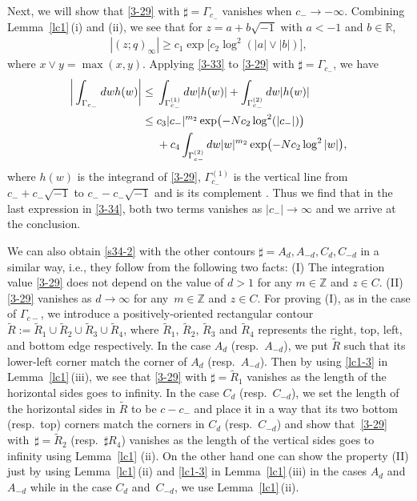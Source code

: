 \documentclass[11pt]{article}
\numberwithin{equation}{section}
\numberwithin{equation}{section}
\def\i{\infty}
\def\R{\mathbb{R}}
\begin{document}
 Next, we will show that \eqref{3-29} with $\sharp=\Gamma_{c_-}$ vanishes when $c_-\rightarrow -\i$. Combining Lem\-ma~\ref{lc1}\,(i) and (ii), we see that
 for $z=a+b\sqrt{-1}$ with $a<-1$ and $b\in\R$,
 \begin{align}
 \label{3-33}
 |(z;q)_{\i}|\ge c_1\exp\bigl[c_2\log^2(|a|\vee |b|)\bigr],
 \end{align}
 where $x\vee y=\max(x,y)$. Applying \eqref{3-33} to
 \eqref{3-29} with $\sharp=\Gamma_{c_-}$, we have
 \begin{align}
 \bigg| \int_{\Gamma_{c_-}} {\rm d}w h(w)\bigg|
 \le{}& \int_{\Gamma^{(1)}_{c_-}}{\rm d}w |h(w)|+\int_{\Gamma^{(2)}_{c_-}}{\rm d}w |h(w)|
 \nonumber\\
\le{}& c_3 |c_-|^{m_2}\exp\bigl(-Nc_2\log^2(|c_-|)\bigr) \nonumber\\
 &+c_4\int_{\Gamma_{c-}^{(2)}} {\rm d}w |w|^{m_2}
 \exp\bigl(-Nc_2\log^2|w|\bigr),
 \label{3-34}
 \end{align}
 where $h(w)$ is the integrand of \eqref{3-29}, $\Gamma_{c_-}^{(1)}$
 is the vertical line from $c_-+c_-\sqrt{-1}$ to $c_--c_-\sqrt{-1}$ and  is its complement .
 Thus we find that in the last expression in \eqref{3-34}, both two terms vanishes as $|c_-|\rightarrow\i$ and we arrive at the conclusion.

 We can also obtain \eqref{s34-2} with the other contours $\sharp=A_d,A_{-d},C_d,C_{-d}$ in a similar way, i.e., they follow from the following two facts: (I) The integration value \eqref{3-29} does not depend on the value of $d>1$ for any $m\in\mathbb{Z}$ and $z\in C$. (II) \eqref{3-29} vanishes as $d\rightarrow\infty$ for any~${m\in\mathbb{Z}}$ and $z\in C$. For proving (I), as in the case of $\Gamma_{c-}$, we introduce a positively-oriented rectangular contour~${\tilde{R}:=\tilde{R}_1\cup\tilde{R}_2\cup\tilde{R}_3\cup\tilde{R}_4}$, where $\tilde{R}_1$, $\tilde{R}_2$, $\tilde{R}_3$ and $\tilde{R}_4$ represents the right, top, left, and bottom edge respectively. In the case $A_d$ (resp.\ $A_{-d}$), we put $\tilde{R}$ such that its lower-left corner match the corner of $A_d$ (resp.\ $A_{-d}$). Then by using \eqref{lc1-3} in Lemma~\ref{lc1}\,(iii), we see that \eqref{3-29} with $\sharp=\tilde{R}_1$ vanishes as the length of the horizontal sides goes to infinity. In the case $C_d$ (resp.~$C_{-d}$), we set the length of the horizontal sides in $\tilde{R}$ to be $c-c_-$ and place it in a way that its two bottom (resp.\ top) corners match the corners in $C_d$ (resp.\ $C_{-d}$) and show that~\eqref{3-29} with~${\sharp=\tilde{R}_2}$ (resp.\ $\sharp{R}_4$) vanishes as the length of the vertical sides goes to infinity using Lemma~\ref{lc1} (ii). On the other hand one can show the property (II) just by using Lemma~\ref{lc1}\,(ii) and \eqref{lc1-3} in Lemma~\ref{lc1}\,(iii) in the cases $A_d$ and $A_{-d}$ while in the case $C_{d}$ and~$C_{-d}$, we use Lemma~\ref{lc1}\,(ii).
\end{document}
